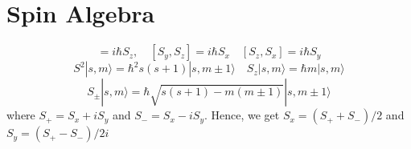 \documentclass[11pt,a4paper]{article}
\begin{document}
\section{Spin Algebra}\label{sec.spin_alegbra}
\begin{equation}
[S_x, S_y]=i \hbar S_z, \quad [S_y, S_z]=i \hbar S_x \quad [S_z, S_x]=i \hbar S_y
\end{equation}
\begin{equation}
S^2|s ,m \rangle = \hbar^2 s(s+1)|s ,m\pm 1\rangle  \quad S_z|s ,m \rangle = \hbar m |s ,m \rangle
\end{equation}
\begin{equation}
S_{\pm}|s, m\rangle = \hbar\sqrt{s(s+1)-m(m \pm 1)}|s,m \pm 1\rangle
\end{equation}
where $S_+ = S_x + iS_y$ and $S_- = S_x - iS_y $. Hence, we get $S_x = (S_+ + S_-)/2$ and $S_y = (S_+ - S_-)/2i $


 


%
\end{document}
